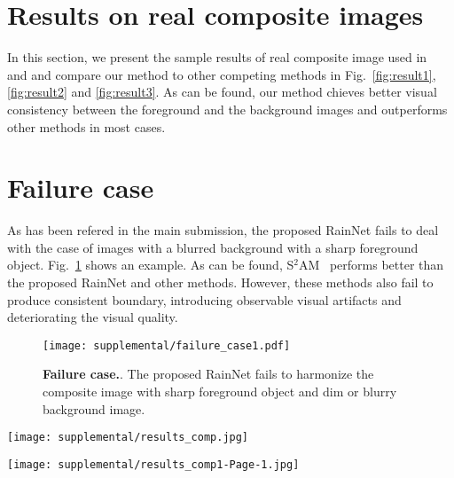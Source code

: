 \documentclass[final]{cvpr}
\begin{document}
\section{Results on real composite images}
\label{sec:real_composite_results}
In this section, we present the sample results of real composite image used in~\cite{tsai2017deep} and \cite{cong2020dovenet} and compare our method to other competing methods in Fig.~\ref{fig:result1}, \ref{fig:result2} and \ref{fig:result3}. As can be found, our method chieves better visual consistency between the foreground and the background images and outperforms other methods in most cases. 


\section{Failure case}
\label{sec:failure_cases}
As has been refered in the main submission, the proposed RainNet fails to deal with the case of images with a blurred background with a sharp foreground object. Fig.~\ref{fig:failure_cases} shows an example. As can be found, S$^2$AM~\cite{cun2020improving} performs better than the proposed RainNet and other methods. However, these methods also fail to produce consistent boundary, introducing observable visual artifacts and deteriorating the visual quality. 

\begin{figure}
\begin{center}
\texttt{[image: supplemental/failure\_case1.pdf]}
\end{center}
   \caption{\textbf{Failure case.}. The proposed RainNet fails to harmonize the composite image with sharp foreground object and dim or blurry background image. }
   \label{fig:failure_cases}
\end{figure}


\begin{figure*}
\begin{center}
\texttt{[image: supplemental/results\_comp.jpg]}
\end{center}
   \caption{\textbf{Example results on real composite images.}. We present real composite images, foreground mask, three state-of-the-art methods, and the proposed model. The samples are taken from the testing dataset of~\cite{tsai2017deep}. Our method achieves better harmonized visual results than competing methods. }
   \label{fig:result1}
\end{figure*}


\begin{figure*}
\begin{center}
\texttt{[image: supplemental/results\_comp1-Page-1.jpg]}
\end{center}
   \caption{\textbf{Example results on real composite images.}. We present real composite images, foreground mask, three state-of-the-art methods, and the proposed model. The samples are taken from the testing dataset of~\cite{tsai2017deep}. Our method achieves better harmonized visual results than competing methods. }
   \label{fig:result2}
\end{figure*}
\end{document}
